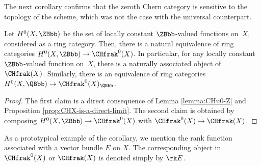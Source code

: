 The next corollary confirms that the zeroth Chern category is sensitive to the topology of the scheme, which was not the case with the universal counterpart.

\begin{corollary}\label{cor:CH0-H0}
Let $H^{0}(X,\ZBbb)$ be the set of locally constant $\ZBbb$-valued functions on~$X$, considered as a ring category. Then, there is a natural equivalence of ring categories $H^{0}(X,\ZBbb)\to\CHfrak^{0}(X)$. In particular, for any locally constant $\ZBbb$-valued function on~$X$, there is a naturally associated object of $\CHfrak(X)$. Similarly, there is an equivalence of ring categories $H^{0}(X,\QBbb)\to\CHfrak^{0}(X)_{\QBbb}$.
\end{corollary}
\begin{proof}
The first claim is a direct consequence of Lemma \ref{lemma:CHu0-Z} and Proposition \ref{prop:CHX-is-a-direct-limit}. The second claim is obtained by composing $H^{0}(X,\ZBbb)\to \CHfrak^{0}(X)$ with $\CHfrak^{0}(X)\to\CHfrak(X)$.
\end{proof}

\begin{remark}
As a prototypical example of the corollary, we mention the rank function associated with a vector bundle $E$ on $X$. The corresponding object in $\CHfrak^{0}(X)$ or $\CHfrak(X)$ is denoted simply by $\rk E$.
\end{remark}

